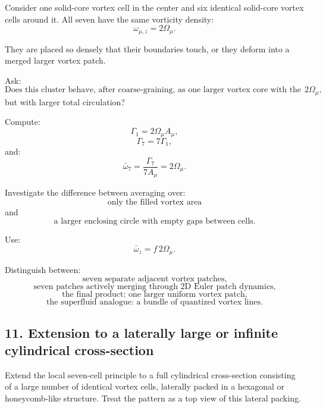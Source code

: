 \documentclass[11pt]{article}
\begin{document}
            Consider one solid-core vortex cell in the center and six identical solid-core vortex cells around it. All seven have the same vorticity density:
            \[
                \omega_{\mu,z}=2\Omega_{\mu}.
            \]
            
            They are placed so densely that their boundaries touch, or they deform into a merged larger vortex patch.
            
            Ask:
            \[
                \text{Does this cluster behave, after coarse-graining, as one larger vortex core with the same effective vorticity density }2\Omega_{\mu},
            \]
            but with larger total circulation?
            
            Compute:
            \[
                \Gamma_1=2\Omega_{\mu}A_{\mu},
            \]
            \[
                \Gamma_7=7\Gamma_1,
            \]
            and:
            \[
                \bar{\omega}_7
                =
                \frac{\Gamma_7}{7A_{\mu}}
                =
                2\Omega_{\mu}.
            \]
            
            Investigate the difference between averaging over:
            \[
                \text{only the filled vortex area}
            \]
            and
            \[
                \text{a larger enclosing circle with empty gaps between cells.}
            \]
            
            Use:
            \[
                \bar{\omega}_z=f\,2\Omega_{\mu}.
            \]
            
            Distinguish between:
            \[
                \text{seven separate adjacent vortex patches,}
            \]
            \[
                \text{seven patches actively merging through 2D Euler patch dynamics,}
            \]
            \[
                \text{the final product: one larger uniform vortex patch,}
            \]
            \[
                \text{the superfluid analogue: a bundle of quantized vortex lines.}
            \]
        
        \subsection{11. Extension to a laterally large or infinite cylindrical cross-section}
            
            Extend the local seven-cell principle to a full cylindrical cross-section consisting of a large number of identical vortex cells, laterally packed in a hexagonal or honeycomb-like structure. Treat the pattern as a top view of this lateral packing.
            
\end{document}
